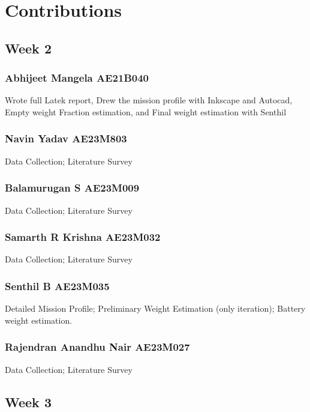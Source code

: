 \documentclass[12 pt]{article}
\begin{document}
{\newpage


\section{Contributions}

\subsection{Week 2}

\subsubsection{Abhijeet Mangela AE21B040}
Wrote full Latek report, Drew the mission profile with Inkscape and Autocad, Empty weight Fraction estimation, and Final weight estimation with Senthil

\subsubsection{Navin Yadav AE23M803}

Data Collection; Literature Survey

\subsubsection{Balamurugan S AE23M009}

Data Collection; Literature Survey

\subsubsection{Samarth R Krishna AE23M032}

Data Collection; Literature Survey

\subsubsection{Senthil B AE23M035}

Detailed Mission Profile; Preliminary Weight Estimation (only iteration); Battery weight estimation.

\subsubsection{Rajendran Anandhu Nair AE23M027}

Data Collection; Literature Survey




\subsection{Week 3}


}
\end{document}
